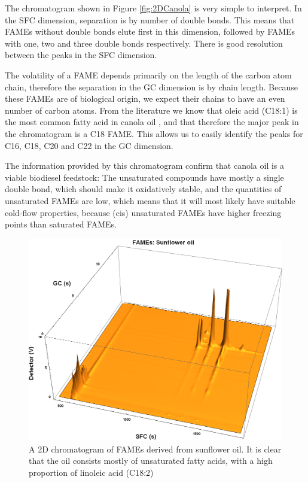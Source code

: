 The chromatogram shown in Figure \ref{fig:2DCanola} is very simple to interpret.
In the SFC dimension, separation is by number of double bonds.
This means that FAMEs without double bonds elute first in this dimension,
followed by FAMEs with one, two and three double bonds respectively. There is
good resolution between the peaks in the SFC dimension.

The volatility of a FAME depends primarily on the length of the carbon atom
chain, therefore the separation in the GC dimension is by chain length. Because
these FAMEs are of biological origin, we expect their chains to have an even
number of carbon atoms. From the literature we know that oleic acid (C18:1) is
the most common fatty acid in canola oil \autocite{JFAOWHOCAC2019}, and that
therefore the major peak in the chromatogram is a C18 FAME. This allows us to
easily identify the peaks for C16, C18, C20 and C22 in the GC dimension.

The information provided by this chromatogram confirm that canola oil is a
vi\-able bio\-diesel feedstock: The unsaturated compounds have mostly a single
double bond, which should make it oxidatively stable, and the quantities of
unsaturated FAMEs are low, which means that it will most likely have suitable
cold-flow properties, because (cis) unsaturated FAMEs have higher freezing
points than saturated FAMEs.

\begin{figure}
\centering
\includegraphics[width=\textwidth]{Figures/Sunflower.png}
\decoRule

\caption[SFC×GC of sunflower oil]{A 2D chromatogram of FAMEs derived from
sunflower oil. It is clear that the oil consists mostly of unsaturated fatty
acids, with a high proportion of linoleic acid (C18:2)}

\label{fig:2DSunflower}
\end{figure}

